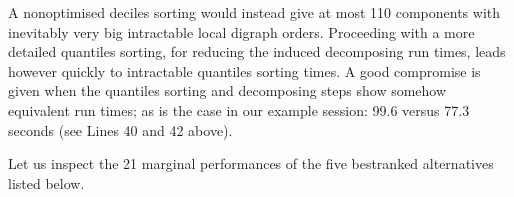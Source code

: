 \documentclass[a4paper,12pt,english]{sphinxhowto}
\begin{document}
A non\sphinxhyphen{}optimised deciles sorting would instead give at most 110 components with inevitably very big intractable local digraph orders. Proceeding with a more detailed quantiles sorting, for reducing the induced decomposing run times, leads however quickly to intractable quantiles sorting times. A good compromise is given when the quantiles sorting and decomposing steps show somehow equivalent run times; as is the case in our example session: 99.6 versus 77.3 seconds (see Lines 40 and 42 above).

Let us inspect the 21 marginal performances of the five best\sphinxhyphen{}ranked alternatives listed below.

\begin{sphinxVerbatim}[commandchars=\\\{\},numbers=left,firstnumber=1,stepnumber=1]
\PYGZbs{}
              \PYG{p}{[}\PYG{p}{]}\PYGZbs{}
              

\end{sphinxVerbatim}
\end{document}
